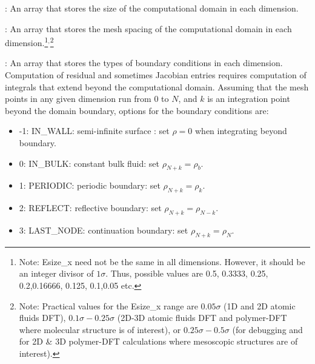 \documentclass[10pt,onecolumn]{article}
\begin{document}

\vspace{0.1in}
:  An array that stores the size of the computational
domain in each dimension.  

\vspace{0.1in}
:  An array that stores the mesh spacing of the
computational domain in each
dimension.\footnote{ Note: Esize\_x need not be the same in all dimensions.
However, it should be an integer divisor of $1 \sigma$.  Thus,
possible values are
0.5, 0.3333, 0.25, 0.2,0.16666, 0.125, 0.1,0.05 etc.}$^,$\footnote{
Note: Practical values for the Esize\_x range are $0.05\sigma$ (1D and
2D atomic fluids DFT), $0.1\sigma - 0.25\sigma$ (2D-3D atomic
fluids DFT and polymer-DFT where molecular structure is of
interest), or $0.25\sigma-0.5\sigma$ (for debugging and for 2D \& 3D
polymer-DFT calculations where mesoscopic structures are of interest).
}

\vspace{0.1in}
:  An array that stores the types of boundary conditions
in each dimension.  Computation of residual and sometimes Jacobian entries requires
computation of integrals that extend beyond the computational domain.  Assuming that the mesh points
in any given dimension run from $0$ to $N$, and $k$ is an integration point beyond the domain boundary, options for the boundary conditions are:
\begin{itemize}
\item{-1: IN\_WALL: semi-infinite surface : set $\rho=0$ when integrating beyond boundary.}
\item{0: IN\_BULK: constant bulk fluid: set $\rho_{N+k}=\rho_b$.}
\item{1: PERIODIC: periodic boundary: set $\rho_{N+k}=\rho_k$.}
\item{2: REFLECT: reflective boundary: set $\rho_{N+k}=\rho_{N-k}$. }
\item{3: LAST\_NODE: continuation boundary: set $\rho_{N+k}=\rho_N$. }
\end{itemize}

\vfill
\break
\end{document}
